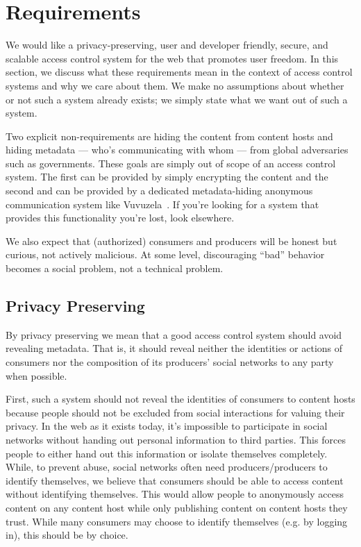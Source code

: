 \documentclass[pdftex,12pt,a4papaer,twoside,notitlepage]{report}
\begin{document}
\section{Requirements}

We would like a privacy-preserving, user and developer friendly, secure, and
scalable access control system for the web that promotes user freedom. In this
section, we discuss what these requirements mean in the context of access
control systems and why we care about them. We make no assumptions about whether
or not such a system already exists; we simply state what we want out of such a
system.

Two explicit non-requirements are hiding the content from content hosts and
hiding metadata --- who's communicating with whom --- from global adversaries
such as governments. These goals are simply out of scope of an access control
system. The first can be provided by simply encrypting the content and the
second and can be provided by a dedicated metadata-hiding anonymous
communication system like Vuvuzela~\cite{vuvuzela}. If you're looking for a
system that provides this functionality you're lost, look elsewhere.

We also expect that (authorized) consumers and producers will be honest but
curious, not actively malicious. At some level, discouraging ``bad'' behavior
becomes a social problem, not a technical problem.

\subsection{Privacy Preserving}

By privacy preserving we mean that a good access control system should avoid
revealing metadata. That is, it should reveal neither the identities or actions
of consumers nor the composition of its producers' social networks to any party
when possible.

First, such a system should not reveal the identities of consumers to content
hosts because people should not be excluded from social interactions for valuing
their privacy. In the web as it exists today, it's impossible to participate in
social networks without handing out personal information to third parties. This
forces people to either hand out this information or isolate themselves
completely. While, to prevent abuse, social networks often need
producers/producers to identify themselves, we believe that consumers should be
able to access content without identifying themselves. This would allow people
to anonymously access content on any content host while only publishing content
on content hosts they trust. While many consumers may choose to identify
themselves (e.g. by logging in), this should be by choice.
\end{document}
